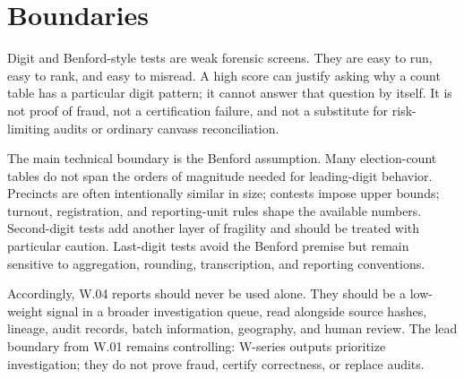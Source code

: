 \section{Boundaries}

Digit and Benford-style tests are weak forensic screens. They are easy to run,
easy to rank, and easy to misread. A high score can justify asking why a count
table has a particular digit pattern; it cannot answer that question by itself.
It is not proof of fraud, not a certification failure, and not a substitute for
risk-limiting audits or ordinary canvass reconciliation.

The main technical boundary is the Benford assumption. Many election-count
tables do not span the orders of magnitude needed for leading-digit behavior.
Precincts are often intentionally similar in size; contests impose upper bounds;
turnout, registration, and reporting-unit rules shape the available numbers.
Second-digit tests add another layer of fragility and should be treated with
particular caution. Last-digit tests avoid the Benford premise but remain
sensitive to aggregation, rounding, transcription, and reporting conventions.

Accordingly, W.04 reports should never be used alone. They should be a
low-weight signal in a broader investigation queue, read alongside source
hashes, lineage, audit records, batch information, geography, and human review.
The lead boundary from W.01 remains controlling: W-series outputs prioritize
investigation; they do not prove fraud, certify correctness, or replace audits.
